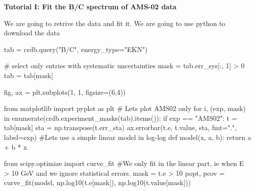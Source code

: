 \documentclass[
  letterpaper,
  DIV=11,
  numbers=noendperiod]{scrreprt}
\newenvironment{Shaded}{\begin{snugshade}}{\end{snugshade}}
\newcommand{\BuiltInTok}[1]{\textcolor[rgb]{0.00,0.23,0.31}{#1}}
\newcommand{\CommentTok}[1]{\textcolor[rgb]{0.37,0.37,0.37}{#1}}
\newcommand{\ControlFlowTok}[1]{\textcolor[rgb]{0.00,0.23,0.31}{#1}}
\newcommand{\DecValTok}[1]{\textcolor[rgb]{0.68,0.00,0.00}{#1}}
\newcommand{\ImportTok}[1]{\textcolor[rgb]{0.00,0.46,0.62}{#1}}
\newcommand{\KeywordTok}[1]{\textcolor[rgb]{0.00,0.23,0.31}{#1}}
\newcommand{\NormalTok}[1]{\textcolor[rgb]{0.00,0.23,0.31}{#1}}
\newcommand{\OperatorTok}[1]{\textcolor[rgb]{0.37,0.37,0.37}{#1}}
\newcommand{\StringTok}[1]{\textcolor[rgb]{0.13,0.47,0.30}{#1}}
\begin{document}
\begin{tcolorbox}[enhanced jigsaw, toprule=.15mm, colframe=quarto-callout-color-frame, bottomrule=.15mm, leftrule=.75mm, left=2mm, breakable, rightrule=.15mm, arc=.35mm, opacityback=0, colback=white]

\vspace{-3mm}\textbf{Tutorial I: Fit the B/C spectrum of AMS-02 data}\vspace{3mm}

We are going to retrive the data and fit it. We are going to use python
to download the data

\begin{Shaded}
\begin{Highlighting}[]
\NormalTok{tab }\OperatorTok{=}\NormalTok{ crdb.query(}\StringTok{"B/C"}\NormalTok{, energy\_type}\OperatorTok{=}\StringTok{"EKN"}\NormalTok{)}

\CommentTok{\# select only entries with systematic uncertainties}
\NormalTok{mask }\OperatorTok{=}\NormalTok{ tab.err\_sys[:, }\DecValTok{1}\NormalTok{] }\OperatorTok{\textgreater{}} \DecValTok{0}
\NormalTok{tab }\OperatorTok{=}\NormalTok{ tab[mask]}

\NormalTok{fig, ax }\OperatorTok{=}\NormalTok{ plt.subplots(}\DecValTok{1}\NormalTok{, }\DecValTok{1}\NormalTok{, figsize}\OperatorTok{=}\NormalTok{(}\DecValTok{6}\NormalTok{,}\DecValTok{4}\NormalTok{))}

\ImportTok{from}\NormalTok{ matplotlib }\ImportTok{import}\NormalTok{ pyplot }\ImportTok{as}\NormalTok{ plt}
\CommentTok{\# Let\textquotesingle{}s plot AMS02 only}
\ControlFlowTok{for}\NormalTok{ i, (exp, mask) }\KeywordTok{in} \BuiltInTok{enumerate}\NormalTok{(crdb.experiment\_masks(tab).items()):}
    \ControlFlowTok{if}\NormalTok{ exp }\OperatorTok{==} \StringTok{"AMS02"}\NormalTok{:}
\NormalTok{        t }\OperatorTok{=}\NormalTok{ tab[mask]}
\NormalTok{        sta }\OperatorTok{=}\NormalTok{ np.transpose(t.err\_sta)}
\NormalTok{        ax.errorbar(t.e, t.value, sta, fmt}\OperatorTok{=}\StringTok{"."}\NormalTok{, label}\OperatorTok{=}\NormalTok{exp)}
\CommentTok{\#Let\textquotesingle{}s use a simple linear model in log{-}log}
\KeywordTok{def}\NormalTok{ model(x, a, b):}
    \ControlFlowTok{return}\NormalTok{ a  }\OperatorTok{+}\NormalTok{ b }\OperatorTok{*}\NormalTok{ x}

\ImportTok{from}\NormalTok{ scipy.optimize }\ImportTok{import}\NormalTok{ curve\_fit}
\CommentTok{\#We only fit in the linear part, ie when E \textgreater{} 10 GeV and we ignore statistical errors. }
\NormalTok{mask }\OperatorTok{=}\NormalTok{ t.e }\OperatorTok{\textgreater{}} \DecValTok{10}
\NormalTok{popt, pcov }\OperatorTok{=}\NormalTok{ curve\_fit(model, np.log10(t.e[mask]), np.log10(t.value[mask]))}


\end{Highlighting}
\end{Shaded}
\end{tcolorbox}
\end{document}
